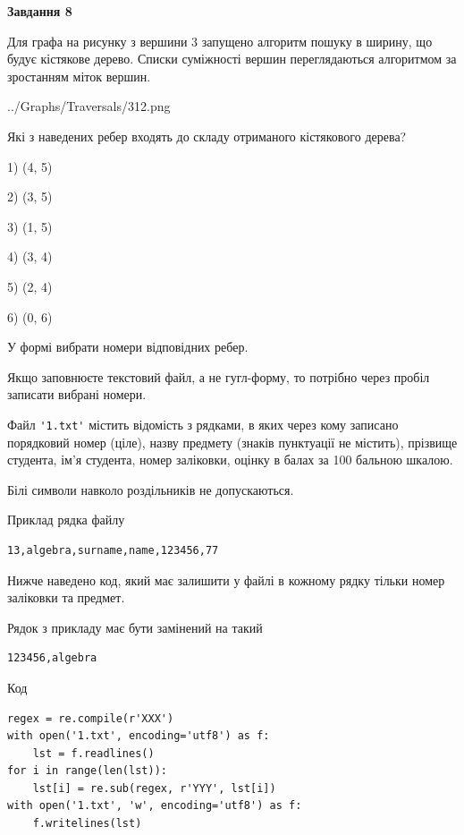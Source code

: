 \documentclass[12pt, ukrainian]{article}
\def\code#1{\Verb!#1!}
\begin{document}
{\begin {large}
{\begin {center}\textbf{Завдання 8}\end {center}}\par
Для графа на рисунку з вершини 3 запущено алгоритм пошуку в ширину, що будує кістякове дерево. Списки суміжності вершин переглядаються алгоритмом за зростанням міток вершин.\par
\begin{center}
	{../Graphs/Traversals/312.png}
\end{center}
\par Які з наведених ребер входять до складу отриманого кістякового дерева?\par
1) (4, 5)\par
2) (3, 5)\par
3) (1, 5)\par
4) (3, 4)\par
5) (2, 4)\par
6) (0, 6)\par
{\vskip 15pt} У формі вибрати номери відповідних ребер.


Якщо заповнюєте текстовий файл, а не гугл-форму, то потрібно через пробіл записа\-ти вибрані номери.\par
\newpage


Файл \code{'1.txt'} містить відомість з рядками, в яких через кому записано поряд\-ковий номер (ціле), назву предмету (знаків пунктуації не містить), прізвище студента, ім'я студента, номер заліковки, оцінку в балах за 100 бальною шкалою.

Білі символи навколо роздільників не допускаються.

Приклад рядка файлу



\begin{verbatim}
13,algebra,surname,name,123456,77
\end{verbatim}


Нижче наведено код, який має залишити у файлі в кожному рядку тільки номер заліковки та предмет.

Рядок з прикладу має бути замінений на такий



\begin{verbatim}
123456,algebra
\end{verbatim}




Код



\begin{verbatim}
regex = re.compile(r'XXX')
with open('1.txt', encoding='utf8') as f:
    lst = f.readlines()
for i in range(len(lst)):
    lst[i] = re.sub(regex, r'YYY', lst[i])
with open('1.txt', 'w', encoding='utf8') as f:
    f.writelines(lst)
\end{verbatim}







\end{large}}
\end{document}
